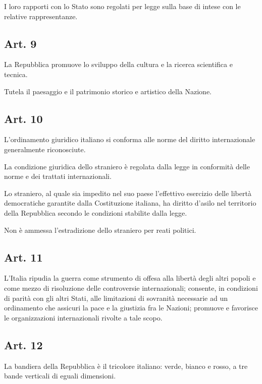 \documentclass{article}
\begin{document}
 I loro rapporti con lo Stato sono regolati per legge sulla base di intese con le relative rappresentanze.

\subsection{ Art. 9}
 La Repubblica promuove lo sviluppo della cultura e la ricerca scientifica e tecnica.

 Tutela il paesaggio e il patrimonio storico e artistico della Nazione.

\subsection{ Art. 10}
 L'ordinamento giuridico italiano si conforma alle norme del diritto internazionale generalmente riconosciute.

 La condizione giuridica dello straniero è regolata dalla legge in conformità delle norme e dei trattati internazionali.

 Lo straniero, al quale sia impedito nel suo paese l'effettivo esercizio delle libertà democratiche garantite dalla Costituzione italiana, ha diritto d'asilo nel territorio della Repubblica secondo le condizioni stabilite dalla legge.

 Non è ammessa l'estradizione dello straniero per reati politici.

\subsection{ Art. 11}
 L'Italia ripudia la guerra come strumento di offesa alla libertà degli altri popoli e come mezzo di risoluzione delle controversie internazionali; consente, in condizioni di parità con gli altri Stati, alle limitazioni di sovranità necessarie ad un ordinamento che assicuri la pace e la giustizia fra le Nazioni; promuove e favorisce le organizzazioni internazionali rivolte a tale scopo.

\subsection{ Art. 12}
 La bandiera della Repubblica è il tricolore italiano: verde, bianco e rosso, a tre bande verticali di eguali dimensioni.
\end{document}
